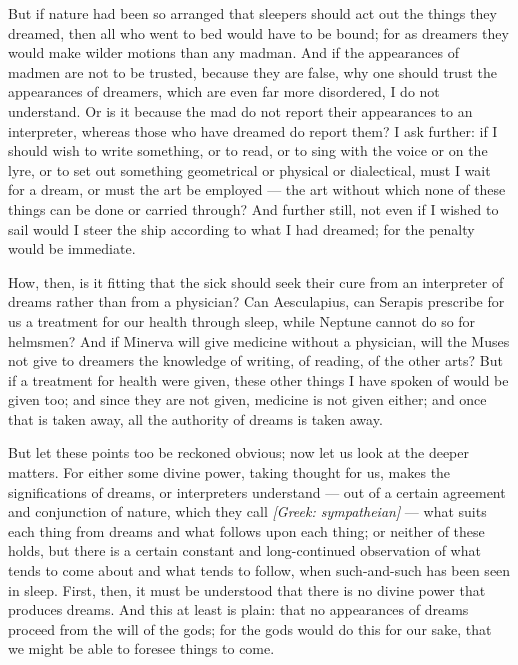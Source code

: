  But if nature had been so arranged that sleepers should act out the things they dreamed, then all who went to bed would have to be bound; for as dreamers they would make wilder motions than any madman. And if the appearances of madmen are not to be trusted, because they are false, why one should trust the appearances of dreamers, which are even far more disordered, I do not understand. Or is it because the mad do not report their appearances to an interpreter, whereas those who have dreamed do report them? I ask further: if I should wish to write something, or to read, or to sing with the voice or on the lyre, or to set out something geometrical or physical or dialectical, must I wait for a dream, or must the art be employed — the art without which none of these things can be done or carried through? And further still, not even if I wished to sail would I steer the ship according to what I had dreamed; for the penalty would be immediate.

 How, then, is it fitting that the sick should seek their cure from an interpreter of dreams rather than from a physician? Can Aesculapius, can Serapis prescribe for us a treatment for our health through sleep, while Neptune cannot do so for helmsmen? And if Minerva will give medicine without a physician, will the Muses not give to dreamers the knowledge of writing, of reading, of the other arts? But if a treatment for health were given, these other things I have spoken of would be given too; and since they are not given, medicine is not given either; and once that is taken away, all the authority of dreams is taken away.

 But let these points too be reckoned obvious; now let us look at the deeper matters. For either some divine power, taking thought for us, makes the significations of dreams, or interpreters understand — out of a certain agreement and conjunction of nature, which they call \textit{[Greek: sympatheian]} — what suits each thing from dreams and what follows upon each thing; or neither of these holds, but there is a certain constant and long-continued observation of what tends to come about and what tends to follow, when such-and-such has been seen in sleep. First, then, it must be understood that there is no divine power that produces dreams. And this at least is plain: that no appearances of dreams proceed from the will of the gods; for the gods would do this for our sake, that we might be able to foresee things to come.

